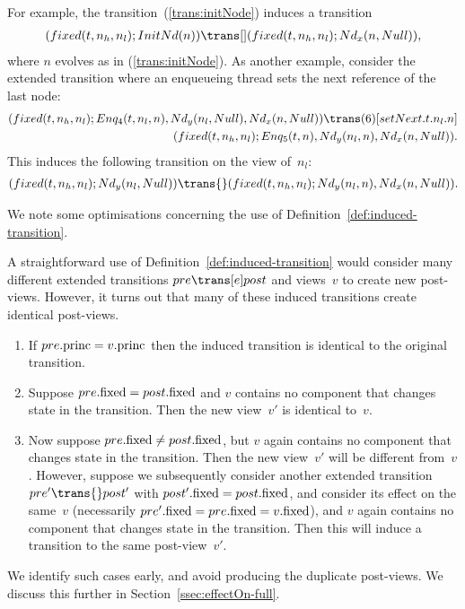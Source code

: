 For example, the  transition~(\ref{trans:initNode}) induces a transition
\[
\begin{align}
(fixed(t, n_h, n_l); \InitNode(n)) \trans[]
  (fixed(t, n_h, n_l); \Node_x(n, Null)),
\end{align}
\]
where $n$ evolves as in (\ref{trans:initNode}).
%
As another example, consider the extended transition where an enqueueing
thread sets the next reference of the last node:
\[
\begin{align}
(fixed(t, n_h, n_l);  Enq_4(t, n_l, n), \Node_y(n_l, Null), \Node_x(n, Null)) 
 \trans(6)[setNext.t.n_l.n] \\
\qquad (fixed(t, n_h, n_l);  Enq_5(t, n), \Node_y(n_l, n), \Node_x(n, Null)).
\end{align}
\]
This induces the following transition on the view of~$n_l$:
\[
\begin{align}
(fixed(t, n_h, n_l);  \Node_y(n_l, Null)) \trans{}  %
  (fixed(t, n_h, n_l);  \Node_y(n_l, n), \Node_x(n, Null)).
\end{align}
\]


We note some optimisations concerning the use of
Definition~\ref{def:induced-transition}.  
%
\begin{opt}
\label{opt:avoid-induced}
A straightforward use of Definition~\ref{def:induced-transition} would
consider many different extended transitions $pre \trans[e] post$ and
views~$v$ to create new post-views.  However, it turns out that many of these
induced transitions create identical post-views.
%
\begin{enumerate}
\item\label{case:avoid-induced-1} If $pre.\mathrm{princ} = v.\mathrm{princ}$ then the induced
  transition is identical to the original transition. 

\item\label{case:avoid-induced-2} Suppose $pre.\mathrm{fixed} = post.\mathrm{fixed}$ and $v$
  contains no component that changes state in the transition.  Then the new
  view~$v'$ is identical to~$v$.

\item\label{case:avoid-induced-3} Now suppose $pre.\mathrm{fixed} \ne post.\mathrm{fixed}$,
  but $v$ again contains no component that changes state in the transition.
  Then the new view~$v'$ will be different from~$v$.  However, suppose we
  subsequently consider another extended transition $pre' \trans{} post'$ with
  $post'.\mathrm{fixed} = post.\mathrm{fixed}$, and consider its effect on the same~$v$
  (necessarily $pre'.\mathrm{fixed} = pre.\mathrm{fixed} = v.\mathrm{fixed}$), and $v$ again contains
  no component that changes state in the transition.  Then this will induce a
  transition to the same post-view~$v'$.
\end{enumerate}
%
We identify such cases early, and avoid producing the duplicate post-views.
We discuss this further in Section~\ref{ssec:effectOn-full}. 
\end{opt}

